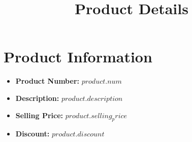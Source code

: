 \documentclass[12pt]{article}
\begin{document}
\title{Product Details}
\author{}
\date{}
\maketitle

\section*{Product Information}

\begin{itemize}
    \item \textbf{\large Product Number:} ${{ product.num }}$
    \item \textbf{\large Description:} ${{ product.description }}$
    \item \textbf{\large Selling Price:} ${{ product.selling_price }}$
    \item \textbf{\large Discount:} ${{ product.discount }}$
\end{itemize}
\end{document}
